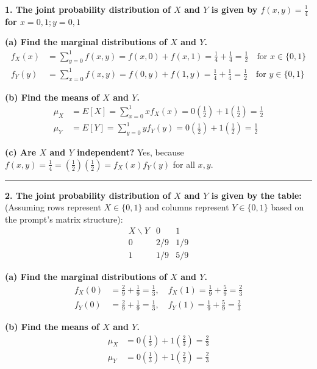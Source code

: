 \documentclass{article}
\begin{document}
\textbf{1. The joint probability distribution of $X$ and $Y$ is given by $f(x, y) = \frac{1}{4}$ for $x = 0,1; y = 0,1$}

\textbf{(a) Find the marginal distributions of $X$ and $Y$.}
\begin{align*}
f_X(x) &= \sum_{y=0}^{1} f(x,y) = f(x,0) + f(x,1) = \frac{1}{4} + \frac{1}{4} = \frac{1}{2} \quad \text{for } x \in \{0,1\} \\
f_Y(y) &= \sum_{x=0}^{1} f(x,y) = f(0,y) + f(1,y) = \frac{1}{4} + \frac{1}{4} = \frac{1}{2} \quad \text{for } y \in \{0,1\}
\end{align*}

\textbf{(b) Find the means of $X$ and $Y$.}
\begin{align*}
\mu_X &= E[X] = \sum_{x=0}^{1} x f_X(x) = 0\left(\frac{1}{2}\right) + 1\left(\frac{1}{2}\right) = \frac{1}{2} \\
\mu_Y &= E[Y] = \sum_{y=0}^{1} y f_Y(y) = 0\left(\frac{1}{2}\right) + 1\left(\frac{1}{2}\right) = \frac{1}{2}
\end{align*}

\textbf{(c) Are $X$ and $Y$ independent?}
Yes, because $f(x,y) = \frac{1}{4} = \left(\frac{1}{2}\right)\left(\frac{1}{2}\right) = f_X(x)f_Y(y)$ for all $x,y$.

\vspace{1em}
\hrule
\vspace{1em}

\textbf{2. The joint probability distribution of $X$ and $Y$ is given by the table:} \\
(Assuming rows represent $X \in \{0,1\}$ and columns represent $Y \in \{0,1\}$ based on the prompt's matrix structure):
$$
\begin{array}{c|cc}
X \backslash Y & 0 & 1 \\
\hline
0 & 2/9 & 1/9 \\
1 & 1/9 & 5/9
\end{array}
$$

\textbf{(a) Find the marginal distributions of $X$ and $Y$.}
\begin{align*}
f_X(0) &= \frac{2}{9} + \frac{1}{9} = \frac{1}{3}, \quad f_X(1) = \frac{1}{9} + \frac{5}{9} = \frac{2}{3} \\
f_Y(0) &= \frac{2}{9} + \frac{1}{9} = \frac{1}{3}, \quad f_Y(1) = \frac{1}{9} + \frac{5}{9} = \frac{2}{3}
\end{align*}

\textbf{(b) Find the means of $X$ and $Y$.}
\begin{align*}
\mu_X &= 0\left(\frac{1}{3}\right) + 1\left(\frac{2}{3}\right) = \frac{2}{3} \\
\mu_Y &= 0\left(\frac{1}{3}\right) + 1\left(\frac{2}{3}\right) = \frac{2}{3}
\end{align*}
\end{document}
